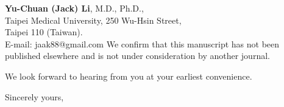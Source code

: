 \documentclass[11pt]{letter} %
\begin{document}
\begin{letter}{\textbf{Yu-Chuan (Jack) Li}, M.D., Ph.D., \\
Taipei Medical University, 250 Wu-Hsin Street, \\ 
Taipei 110 (Taiwan). \\ 
E-mail: jaak88@gmail.com
}
We confirm that this manuscript has not been published elsewhere and is not under consideration by another journal.

We look forward to hearing from you at your earliest convenience.

\closing{Sincerely yours,}




\end{letter}
\end{document}
